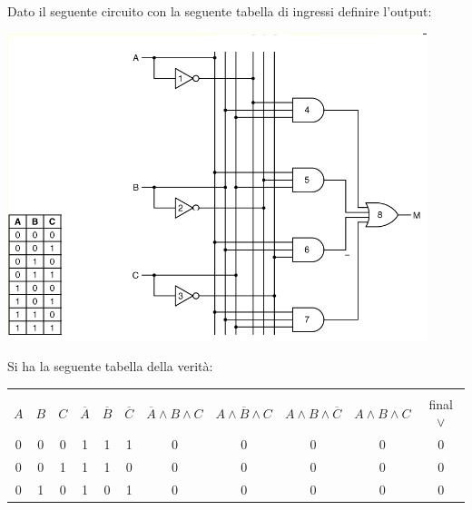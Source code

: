 \documentclass[a4paper,12pt, oneside]{book}
\begin{document}
\begin{esercizio}
  Dato il seguente circuito con la seguente tabella di ingressi definire l'output:
  \begin{center}
    \includegraphics[scale=0.6]{img/es2.png}
  \end{center}
  Si ha la seguente tabella della verità:
  \begin{center}
    \begin{tabular}{|c|c|c|c|c|c|c|c|c|c|c|}
      \hline
      &     &     &                &                &                &                                &                                &                               &                     &              \\
      $A$ & $B$ & $C$ & $\overline{A}$ & $\overline{B}$ & $\overline{C}$ & $\overline{A}\wedge B\wedge C$ & $A\wedge \overline{B}\wedge C$ & $A\wedge B\wedge\overline{C}$ & $A\wedge B\wedge C$ & final $\vee$ \\
      \hline
      0   & 0   & 0   & 1              & 1              & 1              & 0                              & 0                              & 0                             & 0                   & 0            \\
      \hline
      0   & 0   & 1   & 1              & 1              & 0              & 0                              & 0                              & 0                             & 0                   & 0            \\
      \hline
      0   & 1   & 0   & 1              & 0              & 1              & 0                              & 0                              & 0                             & 0                   & 0            \\

\end{tabular}
\end{center}
\end{esercizio}
\end{document}
